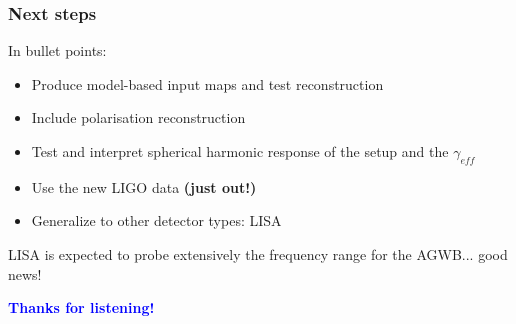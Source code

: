 

\begin{frame}
\frametitle{Next steps}
In bullet points:\\
\medskip
\begin{itemize}
\item Produce model-based input maps and test reconstruction
\item Include polarisation reconstruction
\item Test and interpret spherical harmonic response of the setup and the $\gamma_{eff}$
\item Use the new LIGO data \textbf{\textcolor{blue!50!white}{(just out!)}}
\item Generalize to other detector types: LISA
\end{itemize}
LISA is expected to probe extensively the frequency range for the AGWB... good news!
\medskip
\Large
\pause
\begin{center}
\textbf{\textcolor{blue}{Thanks for listening!}}
\end{center}
\end{frame}

\begin{frame}

\end{frame}

